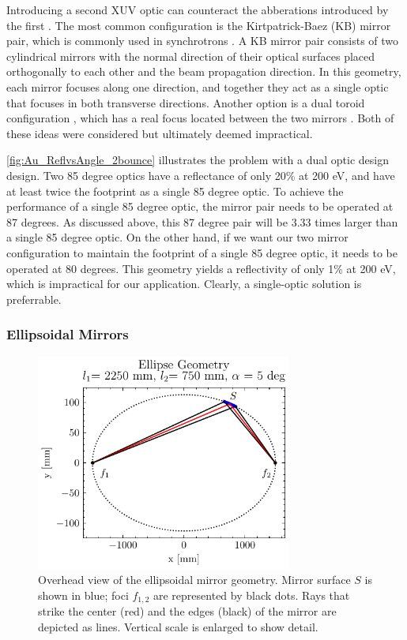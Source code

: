 Introducing a second XUV optic can counteract the abberations introduced by the first \cite{howellsMirrorsSynchrotronRadiationBeamlines1994}. The most common configuration is the Kirtpatrick-Baez (KB) mirror pair, which is commonly used in synchrotrons \cite{kirkpatrickFormationOpticalImages1948}. A KB mirror pair consists of two cylindrical mirrors with the normal direction of their optical surfaces placed orthogonally to each other and the beam propagation direction. In this geometry, each mirror focuses along one direction, and together they act as a single optic that focuses in both transverse directions. Another option is a dual toroid configuration \cite{polettoMicrofocusingAttosecondPulses2013}, which has a real focus located between the two mirrors \cite{polettoMicrofocusingAttosecondPulses2013}. Both of these ideas were considered but ultimately deemed impractical.

\cref{fig:Au_ReflvsAngle_2bounce} illustrates the problem with a dual optic design design. Two 85 degree optics have a reflectance of only 20\% at 200 eV, and have at least twice the footprint as a single 85 degree optic. To achieve the performance of a single 85 degree optic, the mirror pair needs to be operated at 87 degrees. As discussed above, this 87 degree pair will be 3.33 times larger than a single 85 degree optic. On the other hand, if we want our two mirror configuration to maintain the footprint of a single 85 degree optic, it needs to be operated at 80 degrees. This geometry yields a reflectivity of only 1\% at 200 eV, which is impractical for our application. Clearly, a single-optic solution is preferrable.

\subsubsection{Ellipsoidal Mirrors}

\begin{figure}
	\centering
	\includegraphics[width=0.75\textwidth]{figures/chap2/EM_2D.pdf}
	\caption{Overhead view of the ellipsoidal mirror geometry. Mirror surface $S$ is shown in blue; foci $f_{1,2}$ are represented by black dots. Rays that strike the center (red) and the edges (black) of the mirror are depicted as lines. Vertical scale is enlarged to show detail.}
	\label{fig:EM_2D}
\end{figure}

